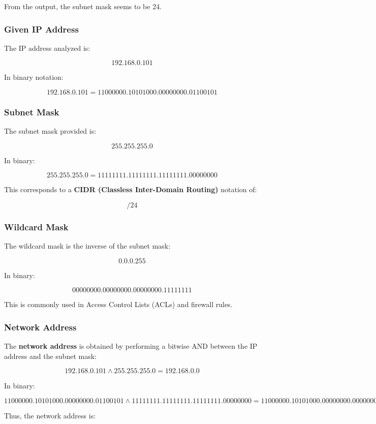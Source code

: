 \documentclass[a4paper,12pt]{article}
\begin{document}
From the output, the subnet mask seems to be 24.

\subsubsection{Given IP Address}
The IP address analyzed is:

\[
\text{192.168.0.101}
\]

In binary notation:

\[
\text{192.168.0.101} = 11000000.10101000.00000000.01100101
\]

\subsubsection{Subnet Mask}
The subnet mask provided is:

\[
\text{255.255.255.0}
\]

In binary:

\[
\text{255.255.255.0} = 11111111.11111111.11111111.00000000
\]

This corresponds to a \textbf{CIDR (Classless Inter-Domain Routing)} notation of:

\[
/24
\]

\subsubsection{Wildcard Mask}
The wildcard mask is the inverse of the subnet mask:

\[
\text{0.0.0.255}
\]

In binary:

\[
00000000.00000000.00000000.11111111
\]

This is commonly used in Access Control Lists (ACLs) and firewall rules.

\subsubsection{Network Address}
The \textbf{network address} is obtained by performing a bitwise AND between the IP address and the subnet mask:

\[
\text{192.168.0.101} \land \text{255.255.255.0} = \text{192.168.0.0}
\]

In binary:

\[
\text{11000000.10101000.00000000.01100101} \land 
\text{11111111.11111111.11111111.00000000} =
\text{11000000.10101000.00000000.00000000}
\]

Thus, the network address is:
\end{document}
